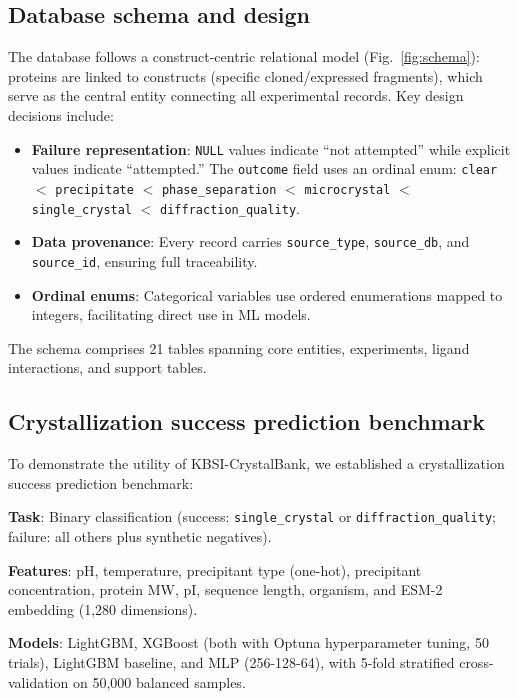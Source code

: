 \documentclass[11pt]{article}
\begin{document}
\subsection*{Database schema and design}

The database follows a construct-centric relational model (Fig.~\ref{fig:schema}): proteins are linked to constructs (specific cloned/expressed fragments), which serve as the central entity connecting all experimental records. Key design decisions include:

\begin{itemize}
  \item \textbf{Failure representation}: \texttt{NULL} values indicate ``not attempted'' while explicit values indicate ``attempted.'' The \texttt{outcome} field uses an ordinal enum: \texttt{clear} $<$ \texttt{precipitate} $<$ \texttt{phase\_separation} $<$ \texttt{microcrystal} $<$ \texttt{single\_crystal} $<$ \texttt{diffraction\_quality}.
  \item \textbf{Data provenance}: Every record carries \texttt{source\_type}, \texttt{source\_db}, and \texttt{source\_id}, ensuring full traceability.
  \item \textbf{Ordinal enums}: Categorical variables use ordered enumerations mapped to integers, facilitating direct use in ML models.
\end{itemize}

The schema comprises 21 tables spanning core entities, experiments, ligand interactions, and support tables.

\subsection*{Crystallization success prediction benchmark}

To demonstrate the utility of KBSI-CrystalBank, we established a crystallization success prediction benchmark:

\textbf{Task}: Binary classification (success: \texttt{single\_crystal} or \texttt{diffraction\_quality}; failure: all others plus synthetic negatives).

\textbf{Features}: pH, temperature, precipitant type (one-hot), precipitant concentration, protein MW, pI, sequence length, organism, and ESM-2 embedding (1,280 dimensions).

\textbf{Models}: LightGBM, XGBoost (both with Optuna hyperparameter tuning, 50 trials), LightGBM baseline, and MLP (256-128-64), with 5-fold stratified cross-validation on 50,000 balanced samples.
\end{document}
